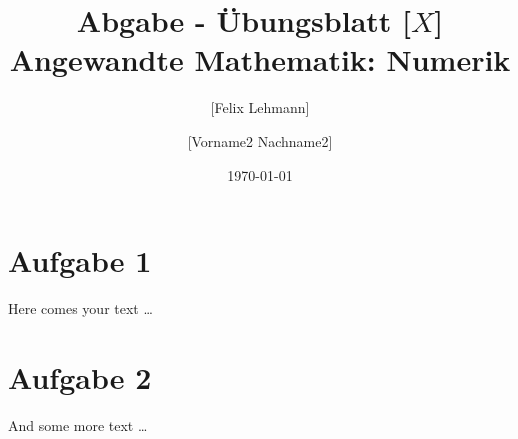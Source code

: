 \documentclass[10pt,a4paper]{article}
\begin{document}
\title{Abgabe - Übungsblatt [$X$]\\
\small{Angewandte Mathematik: Numerik}}
\author{ [Felix Lehmann] \and [Vorname2 Nachname2]}
\date{\today}
\maketitle

\section*{Aufgabe 1}
Here comes your text \ldots

\section*{Aufgabe 2}
And some more text \ldots
\end{document}
